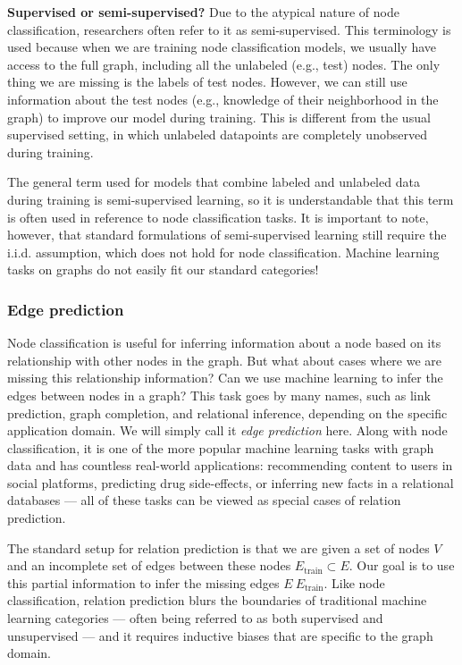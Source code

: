 \documentclass[10pt]{book}
\let\defaultmarginpar\marginpar
\renewcommand\marginpar[2][]{\defaultmarginpar{\itshape\color{gray}#2}}
\begin{document}
\textbf{Supervised or semi-supervised?} Due to the atypical nature of node classification, researchers often refer to it as semi-supervised. This terminology is used because when we are training node classification models, we usually have access to the full graph, including all the unlabeled (e.g., test) nodes. The only thing we are missing is the labels of test nodes. However, we can still use information about the test nodes (e.g., knowledge of their neighborhood in the graph) to improve our model during training. This is different from the usual supervised setting, in which unlabeled datapoints are completely unobserved during training.

The general term used for models that combine labeled and unlabeled
data during training is semi-supervised learning, so it is understandable that this term is often used in reference to node classification tasks. It is important to note, however, that standard formulations of semi-supervised learning still require the i.i.d. assumption, which does not hold for node classification. Machine learning tasks on graphs do not easily fit our standard categories! 

\subsubsection{Edge prediction}

Node classification is useful for inferring information about a node based on its relationship with other nodes in the graph. But what about cases where we are missing this relationship information? Can we use machine learning to infer the edges between nodes in a graph?
This task goes by many names, such as link prediction, graph completion, and relational inference, depending on the specific application domain. We will simply call it \emph{edge prediction}\marginpar{edge prediction} here. Along with node classification, it is one of the more popular machine learning tasks with graph data and has countless real-world applications: recommending content to users in social platforms, predicting drug side-effects, or inferring new
facts in a relational databases --- all of these tasks can be
viewed as special cases of relation prediction.

The standard setup for relation prediction is that we are given a set of nodes $V$ and an incomplete set of edges between these nodes $E_\text{train} \subset E$. Our goal is to use this partial information to infer the missing edges $E \ E_\text{train}$.  Like node classification, relation prediction blurs the boundaries of traditional machine learning categories --- often being referred to as both supervised and unsupervised --- and it requires inductive biases that are specific to the graph domain.
\end{document}
